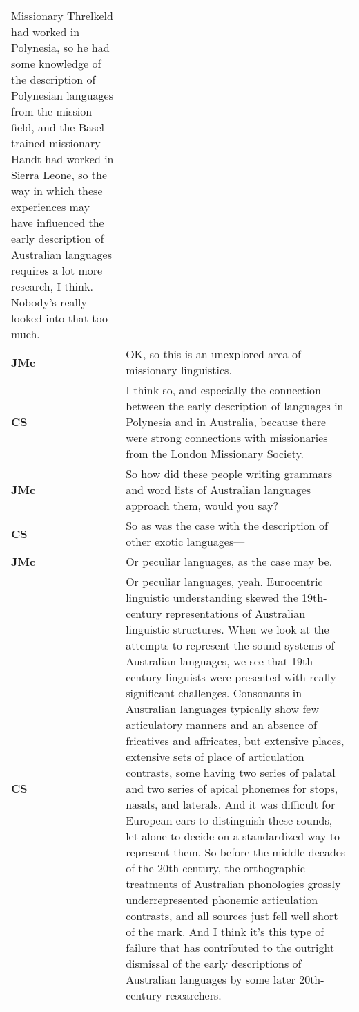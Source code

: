 \documentclass[12pt]{article}
\begin{document}
\begin{flushleft}
\begin{supertabular}{m{0.24415985in}m{5.89766in}}
Missionary Threlkeld had worked in Polynesia, so he had some knowledge of the description of Polynesian languages from the mission field, and the Basel-trained missionary Handt had worked in Sierra Leone, so the way in which these experiences may have influenced the early description of Australian languages requires a lot more research, I think. Nobody’s really looked into that too much.\\
\textbf{JMc}\newline
 &
OK, so this is an unexplored area of missionary linguistics.\\
\textbf{CS}\newline
 &
I think so, and especially the connection between the early description of languages in Polynesia and in Australia, because there were strong connections with missionaries from the London Missionary Society.\\
\textbf{JMc}\newline
 &
So how did these people writing grammars and word lists of Australian languages approach them, would you say?\\
\textbf{CS}\newline
 &
So as was the case with the description of other exotic languages—\\
\textbf{JMc}\newline
 &
Or peculiar languages, as the case may be.\\
\textbf{CS}\newline
 &
Or peculiar languages, yeah. Eurocentric linguistic understanding skewed the 19th-century representations of Australian linguistic structures. When we look at the attempts to represent the sound systems of Australian languages, we see that 19th-century linguists were presented with really significant challenges. Consonants in Australian languages typically show few articulatory manners and an absence of fricatives and affricates, but extensive places, extensive sets of place of articulation contrasts, some having two series of palatal and two series of apical phonemes for stops, nasals, and laterals. And it was difficult for European ears to distinguish these sounds, let alone to decide on a standardized way to represent them. So before the middle decades of the 20th century, the orthographic treatments of Australian phonologies grossly underrepresented phonemic articulation contrasts, and all sources just fell well short of the mark. And I think it’s this type of failure that has contributed to the outright dismissal of the early descriptions of Australian languages by some later 20th-century researchers.\\

\end{supertabular}
\end{flushleft}
\end{document}
